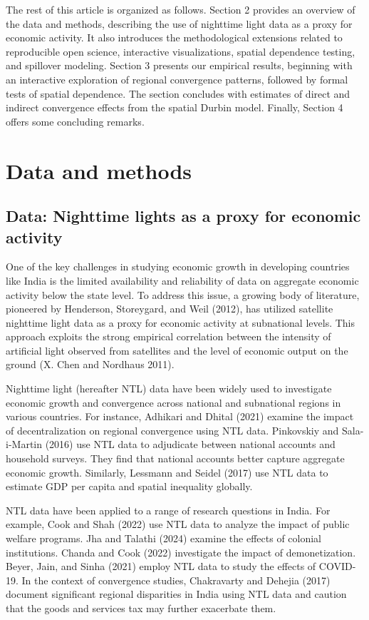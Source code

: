 \documentclass[
  letterpaper,
  DIV=11,
  numbers=noendperiod]{scrartcl}
\begin{document}
The rest of this article is organized as follows. Section 2 provides an
overview of the data and methods, describing the use of nighttime light
data as a proxy for economic activity. It also introduces the
methodological extensions related to reproducible open science,
interactive visualizations, spatial dependence testing, and spillover
modeling. Section 3 presents our empirical results, beginning with an
interactive exploration of regional convergence patterns, followed by
formal tests of spatial dependence. The section concludes with estimates
of direct and indirect convergence effects from the spatial Durbin
model. Finally, Section 4 offers some concluding remarks.

\section{Data and methods}\label{data-and-methods}

\subsection{Data: Nighttime lights as a proxy for economic
activity}\label{data-nighttime-lights-as-a-proxy-for-economic-activity}

One of the key challenges in studying economic growth in developing
countries like India is the limited availability and reliability of data
on aggregate economic activity below the state level. To address this
issue, a growing body of literature, pioneered by Henderson, Storeygard,
and Weil (2012), has utilized satellite nighttime light data as a proxy
for economic activity at subnational levels. This approach exploits the
strong empirical correlation between the intensity of artificial light
observed from satellites and the level of economic output on the ground
(X. Chen and Nordhaus 2011).

Nighttime light (hereafter NTL) data have been widely used to
investigate economic growth and convergence across national and
subnational regions in various countries. For instance, Adhikari and
Dhital (2021) examine the impact of decentralization on regional
convergence using NTL data. Pinkovskiy and Sala-i-Martin (2016) use NTL
data to adjudicate between national accounts and household surveys. They
find that national accounts better capture aggregate economic growth.
Similarly, Lessmann and Seidel (2017) use NTL data to estimate GDP per
capita and spatial inequality globally.

NTL data have been applied to a range of research questions in India.
For example, Cook and Shah (2022) use NTL data to analyze the impact of
public welfare programs. Jha and Talathi (2024) examine the effects of
colonial institutions. Chanda and Cook (2022) investigate the impact of
demonetization. Beyer, Jain, and Sinha (2021) employ NTL data to study
the effects of COVID-19. In the context of convergence studies,
Chakravarty and Dehejia (2017) document significant regional disparities
in India using NTL data and caution that the goods and services tax may
further exacerbate them.
\end{document}
